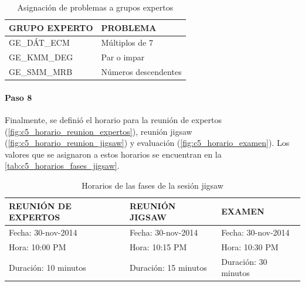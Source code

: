 \begin{longtable}{ll}
	\caption{Asignación de problemas a grupos expertos}	
	\label{tab:c5_asignacion_problemas}\\
	\toprule[0.8mm]
	GRUPO EXPERTO & PROBLEMA \\
	\midrule
	GE\_DÁT\_ECM & Múltiplos de 7\\
	GE\_KMM\_DEG & Par o impar\\
	GE\_SMM\_MRB & Números descendentes\\
	\bottomrule[0.8mm]	
\end{longtable}

\paragraph{Paso 8}
Finalmente, se definió el horario para la reunión de expertos (\autoref{fig:c5_horario_reunion_expertos}), reunión jigsaw (\autoref{fig:c5_horario_reunion_jigsaw}) y evaluación (\autoref{fig:c5_horario_examen}). Los valores que se asignaron a estos horarios se encuentran en la \autoref{tab:c5_horarios_fases_jigsaw}.

\begin{longtable}{|l|l|l|}
	\caption{Horarios de las fases de la sesión jigsaw}	
	\label{tab:c5_horarios_fases_jigsaw}\\
	\toprule[0.8mm]
	REUNIÓN DE EXPERTOS & REUNIÓN JIGSAW & EXAMEN \\
	\midrule
	Fecha: 30-nov-2014 & Fecha: 30-nov-2014 & Fecha: 30-nov-2014\\
	Hora: 10:00 PM & Hora: 10:15 PM & Hora: 10:30 PM\\
	Duración: 10 minutos & Duración: 15 minutos & Duración: 30 minutos\\
	\bottomrule[0.8mm]

\end{longtable}
 
